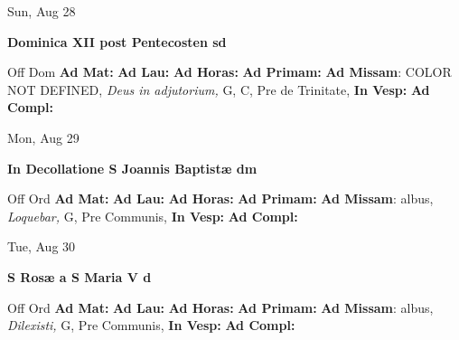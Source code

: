 \documentclass[10pt]{book}
\begin{document}
\begin{center}
\begin{minipage}{3.5in}
\vspace{2em}
\begin{center}Sun, Aug 28
\end{center}
\textbf{ \large Dominica XII post Pentecosten
\textnormal{\normalsize sd}}

\begin{justify}Off Dom
\textbf{Ad Mat: }
\textbf{Ad Lau: }
\textbf{Ad Horas: }
\textbf{Ad Primam: }\textbf{Ad Missam}: COLOR NOT DEFINED, \textit{Deus in adjutorium,} G, C, Pre de Trinitate, 
\textbf{In Vesp: }
\textbf{Ad Compl: }
\end{justify}
\end{minipage}
\end{center}

\begin{center}
\begin{minipage}{3.5in}
\vspace{2em}
\begin{center}Mon, Aug 29
\end{center}
\textbf{ \large In Decollatione S Joannis Baptistæ
\textnormal{\normalsize dm}}

\begin{justify}Off Ord
\textbf{Ad Mat: }
\textbf{Ad Lau: }
\textbf{Ad Horas: }
\textbf{Ad Primam: }\textbf{Ad Missam}: albus, \textit{Loquebar,} G, Pre Communis, 
\textbf{In Vesp: }
\textbf{Ad Compl: }
\end{justify}
\end{minipage}
\end{center}

\begin{center}
\begin{minipage}{3.5in}
\vspace{2em}
\begin{center}Tue, Aug 30
\end{center}
\textbf{ \large S Rosæ a S Maria V
\textnormal{\normalsize d}}

\begin{justify}Off Ord
\textbf{Ad Mat: }
\textbf{Ad Lau: }
\textbf{Ad Horas: }
\textbf{Ad Primam: }\textbf{Ad Missam}: albus, \textit{Dilexisti,} G, Pre Communis, 
\textbf{In Vesp: }
\textbf{Ad Compl: }
\end{justify}
\end{minipage}
\end{center}
\end{document}
